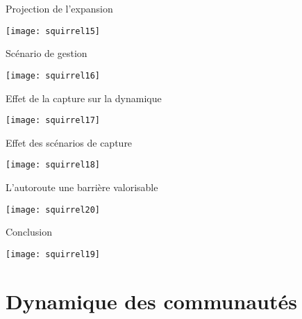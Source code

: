 \documentclass[]{beamer}
\begin{document}
 
 \begin{frame}{Projection de l'expansion}
\begin{center}
  \texttt{[image: squirrel15]}
\end{center}
 \end{frame}

 
 \begin{frame}{Scénario de gestion}
\begin{center}
  \texttt{[image: squirrel16]}
\end{center}
 \end{frame}

 
 \begin{frame}{Effet de la capture sur la dynamique}
\begin{center}
  \texttt{[image: squirrel17]}
\end{center}
 \end{frame}

 
 \begin{frame}{Effet des scénarios de capture}
\begin{center}
  \texttt{[image: squirrel18]}
\end{center}
 \end{frame}

  
 \begin{frame}{L'autoroute une barrière valorisable}
\begin{center}
  \texttt{[image: squirrel20]}
\end{center}
 \end{frame}
 
 
 \begin{frame}{Conclusion}
\begin{center}
  \texttt{[image: squirrel19]}
\end{center}
 \end{frame}
 
\section{Dynamique des communautés}


\end{document}
